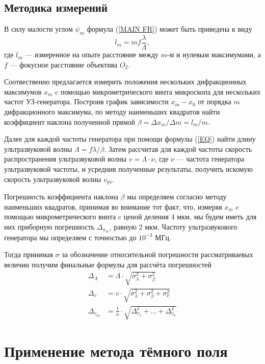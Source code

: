 \documentclass[12pt]{article}
\begin{document}
\subsection*{Методика измерений}
\par
	В силу малости углом $\psi_m$ формула (\ref{MAIN FR}) может быть приведена к виду
\begin{equation}
	l_m = mf \frac{\lambda}{\Lambda}, \label{EQ}
\end{equation}
где $l_m$ --- измеренное на опыте расстояние между $m$-м и нулевым максимумами, а $f$ --- фокусное расстояние объектива $O_2$.
\par
	Соотвественно предлагается измерить положения нескольких дифракционных максимумов $x_m$ c помощью микрометрического винта микроскопа для нескольких частот УЗ-генератора. Построив график зависимости $x_m - x_0$ от порядка $m$ дифракционного максимума, по методу наименьших квадратов найти коэффициент наклона полученной прямой $\beta = \Delta x_m / \Delta m = l_m / m$. 
\par
	Далее для каждой частоты генератора при помощи формулы (\ref{EQ}) найти длину ультразвуковой волны $\Lambda = f \lambda / \beta$. Затем рассчитав для каждой частоты скорость распространения ультразвуковой волны $v = \Lambda \cdot \nu$, где $\nu$ --- частота генератора ультразвуковой частоты, и усреднив полученные результаты, получить искомую скорость ультразвуковой волны $v_\text{уз}$.
\par
	Погрешность коэффициента наклона $\beta$ мы определяем согласно методу наименьших квадратов, принимая во внимание тот факт, что, измеряя $x_m$ c помощью микрометрического винта  c ценой деления 4 мкм, мы будем иметь для них приборную погрешность $\Delta_\text{$x_m$}$, равную 2 мкм. Частоту ультразвукового генератора мы определяем с точностью до $10^{-3}$ МГц.
\par
	Тогда принимая $\sigma$ за обозначение относительной погрешности рассматриваевых величин получим финальные формулы для рассчёта погрешностей
\begin{align*}
	\Delta_\Lambda &= \Lambda \cdot \sqrt{\sigma_\lambda^2 + \sigma_\beta^2} \\
	\Delta_v &= v \cdot \sqrt{\sigma_\lambda^2 + \sigma_\beta^2 + \sigma_\nu^2} \\
	\Delta_\text{$v_\text{уз}$} &= \frac{1}{n} \cdot \sqrt{\Delta_\text{$v_1$}^2 + \dots + \Delta_\text{$v_n$}^2}
\end{align*}
\newpage
\section*{Применение метода тёмного поля}
\end{document}
